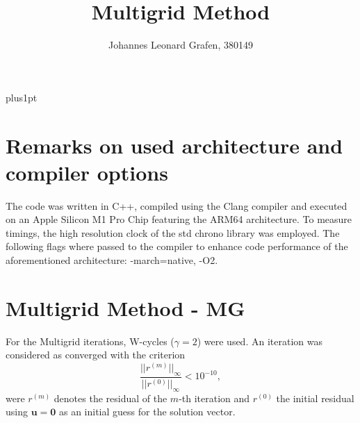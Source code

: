 \documentclass[11pt,a4paper]{article}
\title{Multigrid Method}
\author{Johannes Leonard Grafen, 380149}
\begin{document}
\renewcommand\baselinestretch{1.0}
\baselineskip=18pt plus1pt	

\maketitle
\newpage
{}
\tableofcontents
\listoffigures	%
\newpage

\section{Remarks on used architecture and compiler options}
The code was written in C++, compiled using the Clang compiler and executed on an Apple Silicon M1 Pro Chip featuring the ARM64 architecture. To measure timings, the high resolution clock of the std chrono library was employed. The following flags where passed to the compiler to enhance code performance of the aforementioned architecture: -march=native, -O2. 

\section{Multigrid Method - MG}
\label{chapter:MG}
For the Multigrid iterations, W-cycles ($\gamma = 2$) were used. An iteration was considered as converged with the criterion 
\begin{equation}
	\frac{|| r^{(m)}||_{\infty}}{|| r^{(0)}||_{\infty}} < 10^{-10} ,
\end{equation}
were $r^{(m)}$ denotes the residual of the $m$-th iteration and $r^{(0)}$ the initial residual using $\mathbf{u} = \mathbf{0}$ as an initial guess for the solution vector.
\end{document}
